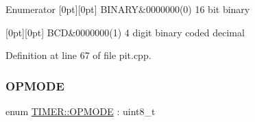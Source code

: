 \begin{DoxyEnumFields}{Enumerator}
[0pt][0pt]{}\mbox{\label{namespace_t_i_m_e_r_aa762d05daed3ea97420e855a5d03253da99f5fa2a10e384e9980cc7b9d2053094}} 
B\+I\+N\+A\+RY&0000\textquotesingle{}000(0) 16 bit binary \\
\hline

[0pt][0pt]{}\mbox{\label{namespace_t_i_m_e_r_aa762d05daed3ea97420e855a5d03253dac8b1953c3a3129fb92120b332014a43a}} 
B\+CD&0000\textquotesingle{}000(1) 4 digit binary coded decimal \\
\hline

\end{DoxyEnumFields}


Definition at line 67 of file pit.\+cpp.

\mbox{\label{namespace_t_i_m_e_r_a3231391ecc5f5895452fcc54c5fabe26}} 
\subsubsection{\texorpdfstring{O\+P\+M\+O\+DE}{OPMODE}}
{\footnotesize\ttfamily enum \hyperlink{namespace_t_i_m_e_r_a3231391ecc5f5895452fcc54c5fabe26}{T\+I\+M\+E\+R\+::\+O\+P\+M\+O\+DE} \+: uint8\+\_\+t}

